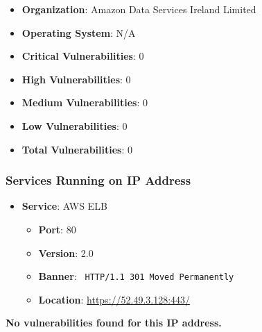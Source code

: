 \documentclass{article}
\begin{document}
\begin{itemize}
    \item \textbf{Organization}: Amazon Data Services Ireland Limited
    \item \textbf{Operating System}:  N/A 
    \item \textbf{Critical Vulnerabilities}: 0
    \item \textbf{High Vulnerabilities}: 0
    \item \textbf{Medium Vulnerabilities}: 0
    \item \textbf{Low Vulnerabilities}: 0
    \item \textbf{Total Vulnerabilities}: 0
\end{itemize}

\subsubsection*{Services Running on IP Address}

\begin{itemize}
    
        \item \textbf{Service}: AWS ELB
        \begin{itemize}
            \item \textbf{Port}: 80
            \item \textbf{Version}:  2.0 
            \item \textbf{Banner}: \texttt{
                HTTP/1.1 301 Moved Permanently
            }
            \item \textbf{Location}: \href{ https://52.49.3.128:443/ }{ https://52.49.3.128:443/ }
        \end{itemize}
    
\end{itemize}


\textbf{No vulnerabilities found for this IP address.}




\clearpage
\end{document}
